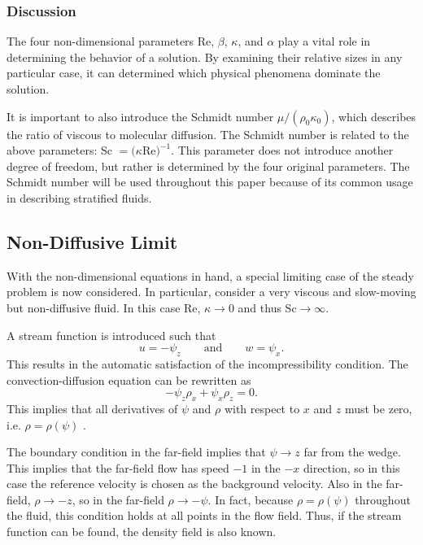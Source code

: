 \documentclass[12pt]{article}
\begin{document}
\subsubsection{Discussion}
The four non-dimensional parameters Re, $\beta$, $\kappa$, and $\alpha$ play a vital role in determining the behavior of a solution. By examining their relative sizes in any particular case, it can determined which physical phenomena dominate the solution.

It is important to also introduce the Schmidt number $\mu/(\rho_0\kappa_0)$, which describes the ratio of viscous to molecular diffusion. The Schmidt number is related to the above parameters: Sc $=(\kappa$Re$)^{-1}$. This parameter does not introduce another degree of freedom, but rather is determined by the four original parameters. The Schmidt number will be used throughout this paper because of its common usage in describing stratified fluids.

\subsection{Non-Diffusive Limit}

With the non-dimensional equations in hand, a special limiting case of the steady problem is now considered. In particular, consider a very viscous and slow-moving but non-diffusive fluid. In this case Re, $\kappa\rightarrow 0$ and thus Sc$\rightarrow\infty$.

A stream function is introduced such that
\begin{equation}
u=-\psi_z\qquad\text{and}\qquad w = \psi_x.
\end{equation}
This results in the automatic satisfaction of the incompressibility condition. The convection-diffusion equation  can be rewritten as
\begin{equation}
-\psi_z\rho_x+\psi_x\rho_z=0.
\end{equation}
This implies that all derivatives of $\psi$ and $\rho$ with respect to $x$ and $z$ must be zero, i.e. $\rho=\rho(\psi)$ \cite{writeup}.

The boundary condition in the far-field implies that $\psi\rightarrow z$ far from the wedge. This implies that the far-field flow has speed $-1$ in the $-x$ direction, so in this case the reference velocity is chosen as the background velocity. Also in the far-field, $\rho\rightarrow-z$, so in the far-field $\rho\rightarrow-\psi$. In fact, because $\rho=\rho(\psi)$ throughout the fluid, this condition holds at all points in the flow field. Thus, if the stream function can be found, the density field is also known.
\end{document}

